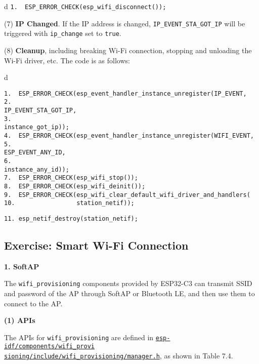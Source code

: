 \documentclass[a4paper,12pt]{book}
\begin{document}
\begin{codebloc}
\begin{tabular}{d}
\verb|1.  ESP_ERROR_CHECK(esp_wifi_disconnect());|
\end{tabular}
\end{codebloc}

(7) \textbf{IP Changed}. If the IP address is changed, \verb|IP_EVENT_STA_GOT_IP| will be triggered with \verb|ip_change| set to \verb|true|.

(8) \textbf{Cleanup}, including breaking Wi-Fi connection, stopping and unloading the Wi-Fi driver, etc. The code is as follows:

\begin{codebloc}
\begin{tabular}{d}
\vspace{2pt}
\begin{verbatim}
1.  ESP_ERROR_CHECK(esp_event_handler_instance_unregister(IP_EVENT,
2.                                                        IP_EVENT_STA_GOT_IP,
3.                                                        instance_got_ip));
4.  ESP_ERROR_CHECK(esp_event_handler_instance_unregister(WIFI_EVENT,
5.                                                        ESP_EVENT_ANY_ID,
6.                                                        instance_any_id));
7.  ESP_ERROR_CHECK(esp_wifi_stop());
8.  ESP_ERROR_CHECK(esp_wifi_deinit());
9.  ESP_ERROR_CHECK(esp_wifi_clear_default_wifi_driver_and_handlers(
10.                 station_netif));
\end{verbatim}
\verb|11. esp_netif_destroy(station_netif);|
\end{tabular}
\end{codebloc}

\subsection{Exercise: Smart Wi-Fi Connection}
\textbf{1. SoftAP}

The \verb|wifi_provisioning| components provided by ESP32-C3 can transmit SSID and password of the AP through SoftAP or Bluetooth LE, and then use them to connect to the AP.

\textbf{(1) APIs}

The APIs for \verb|wifi_provisioning| are defined in \href{https://github.com/espressif/esp-idf/blob/master/components/wifi_provisioning/include/wifi_provisioning/manager.h}{\texttt{esp-idf/components/wifi\_provi\\ sioning/include/wifi\_provisioning/manager.h}}, as shown in Table 7.4.
\end{document}

